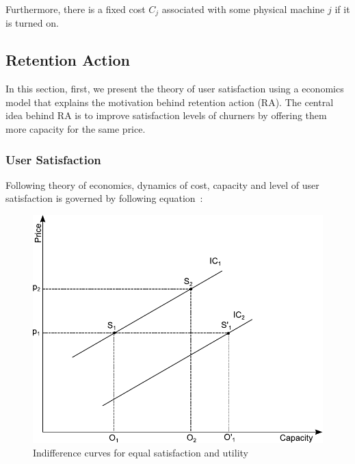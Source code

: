 Furthermore, there is a fixed cost $C_j$ associated with some physical machine $j$ if it is turned on.

\subsection{Retention Action}
In this section, first, we present the theory of user satisfaction using a economics model that explains the motivation behind retention action (RA). The central idea behind RA is to improve satisfaction levels of churners by offering them more capacity for the same price. 

 
\subsubsection{User Satisfaction}
Following theory of economics, dynamics of cost, capacity and level of user satisfaction is governed by following equation~\cite{chen2011tradeoffs}: 

\begin{figure}[!h]
\centering
\includegraphics[scale=0.6]{pic/4.pdf} 
\caption{Indifference curves for equal satisfaction and utility}
\label{utility}
\end{figure}

